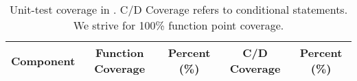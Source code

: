 

\begin{table}
  \caption{
    Unit-test coverage in \dracor.  C/D Coverage refers to conditional
    statements.  We strive for 100\% function point coverage.  
  }
  \label{tab:coverage}
  \begin{center}
    \begin{tabular}{lllll}\hline\hline
      \multicolumn{1}{c}{Component} &
      \multicolumn{1}{c}{Function Coverage} &
      \multicolumn{1}{c}{Percent (\%)} &
      \multicolumn{1}{c}{C/D Coverage} &
      \multicolumn{1}{c}{Percent (\%)} \\\hline


\end{tabular}
\end{center}
\end{table}
